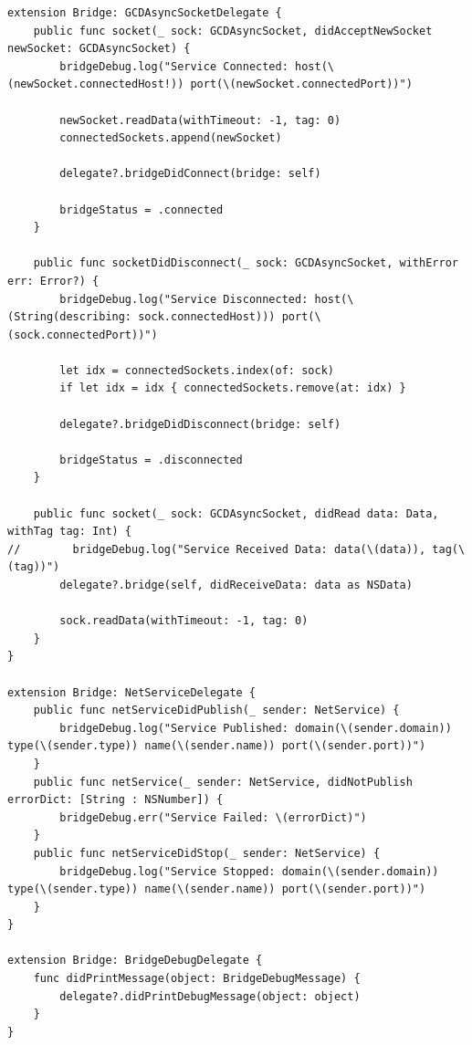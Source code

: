 \begin{lstlisting}
extension Bridge: GCDAsyncSocketDelegate {
    public func socket(_ sock: GCDAsyncSocket, didAcceptNewSocket newSocket: GCDAsyncSocket) {
        bridgeDebug.log("Service Connected: host(\(newSocket.connectedHost!)) port(\(newSocket.connectedPort))")
        
        newSocket.readData(withTimeout: -1, tag: 0)
        connectedSockets.append(newSocket)
        
        delegate?.bridgeDidConnect(bridge: self)
        
        bridgeStatus = .connected
    }
    
    public func socketDidDisconnect(_ sock: GCDAsyncSocket, withError err: Error?) {
        bridgeDebug.log("Service Disconnected: host(\(String(describing: sock.connectedHost))) port(\(sock.connectedPort))")
        
        let idx = connectedSockets.index(of: sock)
        if let idx = idx { connectedSockets.remove(at: idx) }
        
        delegate?.bridgeDidDisconnect(bridge: self)
        
        bridgeStatus = .disconnected
    }
    
    public func socket(_ sock: GCDAsyncSocket, didRead data: Data, withTag tag: Int) {
//        bridgeDebug.log("Service Received Data: data(\(data)), tag(\(tag))")
        delegate?.bridge(self, didReceiveData: data as NSData)
        
        sock.readData(withTimeout: -1, tag: 0)
    }
}

extension Bridge: NetServiceDelegate {
    public func netServiceDidPublish(_ sender: NetService) {
        bridgeDebug.log("Service Published: domain(\(sender.domain)) type(\(sender.type)) name(\(sender.name)) port(\(sender.port))")
    }
    public func netService(_ sender: NetService, didNotPublish errorDict: [String : NSNumber]) {
        bridgeDebug.err("Service Failed: \(errorDict)")
    }
    public func netServiceDidStop(_ sender: NetService) {
        bridgeDebug.log("Service Stopped: domain(\(sender.domain)) type(\(sender.type)) name(\(sender.name)) port(\(sender.port))")
    }
}

extension Bridge: BridgeDebugDelegate {
    func didPrintMessage(object: BridgeDebugMessage) {
        delegate?.didPrintDebugMessage(object: object)
    }
}
\end{lstlisting}

